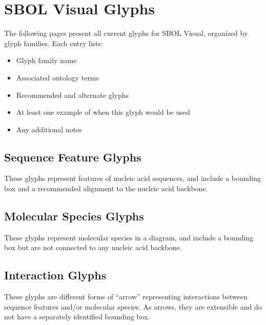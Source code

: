 \section{SBOL Visual Glyphs}\label{apdx:symbols}

The following pages present all current glyphs for SBOL Visual, organized by glyph families.
Each entry lists:
\begin{itemize}
\item Glyph family name
\item Associated ontology terms
\item Recommended and alternate glyphs
\item At least one example of when this glyph would be used
\item Any additional notes
\end{itemize}

\subsection{Sequence Feature Glyphs}

These glyphs represent features of nucleic acid sequences, and include a bounding box and a recommended alignment to the nucleic acid backbone.




\subsection{Molecular Species Glyphs}

These glyphs represent molecular species in a diagram, and include a bounding box but are not connected to any nucleic acid backbone.




\subsection{Interaction Glyphs}

These glyphs are different forms of ``arrow'' representing interactions between sequence features and/or molecular species. As arrows, they are extensible and do not have a separately identified bounding box.


